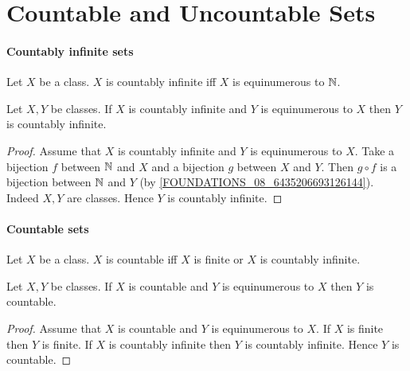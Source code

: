 \documentclass[10pt]{article}
\begin{document}
  \section{Countable and Uncountable Sets}

  \paragraph{Countably infinite sets}

  \begin{forthel}
    \begin{definition}
      Let $X$ be a class.
      $X$ is countably infinite iff $X$ is equinumerous to $\mathbb{N}$.
    \end{definition}
  \end{forthel}

  \begin{forthel}
    \begin{proposition}
      Let $X, Y$ be classes.
      If $X$ is countably infinite and $Y$ is equinumerous to $X$ then $Y$ is
      countably infinite.
    \end{proposition}
    \begin{proof}
      Assume that $X$ is countably infinite and $Y$ is equinumerous to $X$.
      Take a bijection $f$ between $\mathbb{N}$ and $X$ and a bijection $g$ between
      $X$ and $Y$.
      Then $g \circ f$ is a bijection between $\mathbb{N}$ and $Y$
      (by \cref{FOUNDATIONS_08_6435206693126144}).
      Indeed $X, Y$ are classes.
      Hence $Y$ is countably infinite.
    \end{proof}
  \end{forthel}


  \paragraph{Countable sets}

  \begin{forthel}
    \begin{definition}
      Let $X$ be a class.
      $X$ is countable iff $X$ is finite or $X$ is countably infinite.
    \end{definition}
  \end{forthel}

  \begin{forthel}
    \begin{proposition}
      Let $X, Y$ be classes.
      If $X$ is countable and $Y$ is equinumerous to $X$ then $Y$ is countable.
    \end{proposition}
    \begin{proof}
      Assume that $X$ is countable and $Y$ is equinumerous to $X$.
      If $X$ is finite then $Y$ is finite.
      If $X$ is countably infinite then $Y$ is countably infinite.
      Hence $Y$ is countable.
    \end{proof}
  \end{forthel}
\end{document}
